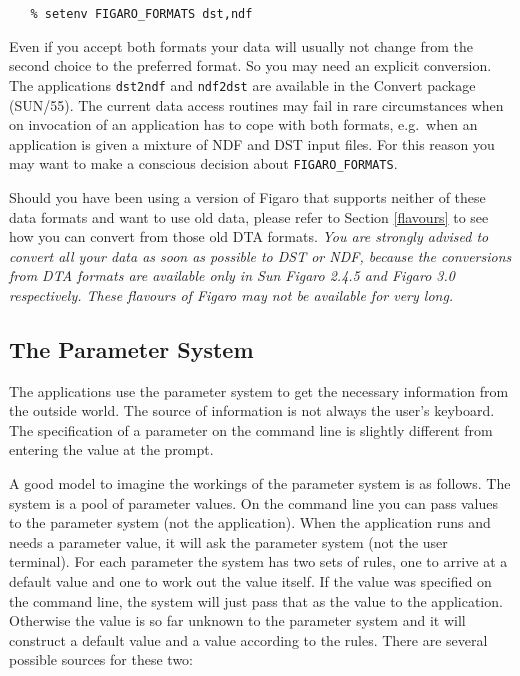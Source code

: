 \begin{verbatim}
   % setenv FIGARO_FORMATS dst,ndf
\end{verbatim}

Even if you accept both formats your data will usually not change from
the second choice to the preferred format. So you may need an explicit
conversion.  The applications {\tt dst2ndf} and {\tt ndf2dst} are
available in the Convert package (SUN/55).  The current data access
routines may fail in rare circumstances when on invocation of an
application has to cope with both formats, e.g.\ when an application is
given a mixture of NDF and DST input files.  For this reason you may
want to make a conscious decision about {\tt FIGARO\_FORMATS}.

Should you have been using a version of Figaro that supports neither of
these data formats and want to use old data, please refer to Section
\ref{flavours} to see how you can convert from those old DTA formats.
{\it You are strongly advised to convert all your data as soon as
possible to DST or NDF, because the conversions from DTA formats are
available only in Sun Figaro 2.4.5 and Figaro 3.0 respectively. These
flavours of Figaro may not be available for very long.}


\subsection{The Parameter System}

The applications use the parameter system to get the necessary
information from the outside world. The source of information is not
always the user's keyboard. The specification of a parameter on the
command line is slightly different from entering the value at the
prompt.

A good model to imagine the workings of the parameter system is as
follows.  The system is a pool of parameter values. On the command line
you can pass values to the parameter system (not the application). When
the application runs and needs a parameter value, it will ask the
parameter system (not the user terminal). For each parameter the system
has two sets of rules, one to arrive at a default value and one to work
out the value itself. If the value was specified on the command line,
the system will just pass that as the value to the application.
Otherwise the value is so far unknown to the parameter system and it
will construct a default value and a value according to the rules.
There are several possible sources for these two:

